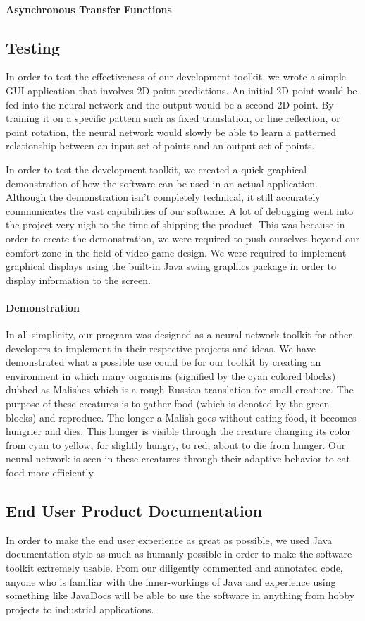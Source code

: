 \documentclass[letterpaper, 10pt]{article}
\begin{document}
		\paragraph{Asynchronous Transfer Functions}
	\subsection{Testing}
		In order to test the effectiveness of our development toolkit, we wrote a simple GUI application that involves 2D point predictions. An initial 2D point would be fed into the neural network and the output would be a second 2D point. By training it on a specific pattern such as fixed translation, or line reflection, or point rotation, the neural network would slowly be able to learn a patterned relationship between an input set of points and an output set of points.
	
		In order to test the development toolkit, we created a quick graphical demonstration of how the software can be used in an actual application. Although the demonstration isn't completely technical, it still accurately communicates the vast capabilities of our software. A lot of debugging went into the project very nigh to the time of shipping the product. This was because in order to create the demonstration, we were required to push ourselves beyond our comfort zone in the field of video game design. We were required to implement graphical displays using the built-in Java swing graphics package in order to display information to the screen.
		\paragraph{Demonstration} In all simplicity, our program was designed as a neural network toolkit for other developers to implement in their respective projects and ideas. We have demonstrated what a possible use could be for our toolkit by creating an environment in which many organisms (signified by the cyan colored blocks) dubbed as Malishes which is a rough Russian translation for small creature. The purpose of these creatures is to gather food (which is denoted by the green blocks) and reproduce. The longer a Malish goes without eating food, it becomes hungrier and dies. This hunger is visible through the creature changing its color from cyan to yellow, for slightly hungry, to red, about to die from hunger. Our neural network is seen in these creatures through their adaptive behavior to eat food more efficiently.  
	\subsection{End User Product Documentation}
		In order to make the end user experience as great as possible, we used Java documentation style as much as humanly possible in order to make the software toolkit extremely usable. From our diligently commented and annotated code, anyone who is familiar with the inner-workings of Java and experience using something like JavaDocs will be able to use the software in anything from hobby projects to industrial applications.
		
\end{document}
